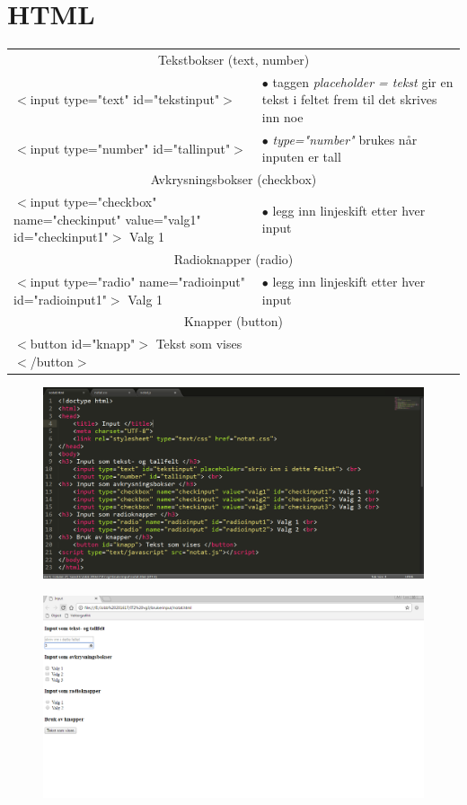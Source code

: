 \documentclass[a4paper, norsk, 10pt]{article}
\begin{document}
\section*{HTML}
\begin{tabular}{|p{10cm}|p{6cm}|}
\hline
\multicolumn{2}{|c|}{\large{Tekstbokser (text, number) } \cellcolor{lightgray}} \\
$<$input type="text"  id="tekstinput"$>$ &$\bullet$ taggen \textit{placeholder = tekst} gir en tekst i feltet frem til det skrives inn noe \\
$<$input type="number"  id="tallinput"$>$& $\bullet$ \textit{type="number"} brukes når inputen er tall \\
\multicolumn{2}{|c|}{\large{Avkrysningsbokser  (checkbox) } \cellcolor{lightgray}} \\
$<$input type="checkbox" name="checkinput" value="valg1" id="checkinput1"$>$ Valg 1 & $\bullet$ legg inn linjeskift etter hver input\\
\multicolumn{2}{|c|}{\large{Radioknapper (radio) } \cellcolor{lightgray}} \\
$<$input type="radio" name="radioinput" id="radioinput1"$>$ Valg 1 & $\bullet$ legg inn linjeskift etter hver input \\
\multicolumn{2}{|c|}{\large{Knapper (button)} \cellcolor{lightgray}} \\
$<$button id="knapp"$>$ Tekst som vises $<$/button$>$& \\
\hline
\end{tabular}
\begin{figure}[h!]
\includegraphics[width=0.8\linewidth]{html1.png}
\end{figure}
\begin{figure}[h!]
\includegraphics[width=0.8\linewidth]{html2.png}
\end{figure}
\end{document}
